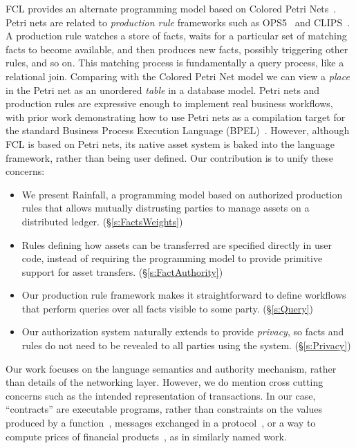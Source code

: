 FCL provides an alternate programming model based on Colored Petri Nets~\cite{Jensen1981:ColouredPetri}. Petri nets are related to \emph{production rule} frameworks such as OPS5~\cite{Forgy1981:OPS5} and CLIPS~\cite{Riley2017:CLIPS}. A production rule watches a store of facts, waits for a particular set of matching facts to become available, and then produces new facts, possibly triggering other rules, and so on. This matching process is fundamentally a query process, like a relational join. Comparing with the Colored Petri Net model we can view a \emph{place} in the Petri net as an unordered \emph{table} in a database model. Petri nets and production rules are expressive enough to implement real business workflows, with prior work demonstrating how to use Petri nets as a compilation target for the standard Business Process Execution Language (BPEL)~\cite{Lohmann2009:PetriBPEL}.  However, although FCL is based on Petri nets, its native asset system is baked into the language framework, rather than being user defined. Our contribution is to unify these concerns:


\begin{itemize}
\item We present Rainfall, a programming model based on authorized production rules that allows mutually distrusting parties to manage assets on a distributed ledger. (\S\ref{s:FactsWeights})

\item Rules defining how assets can be transferred are specified directly in user code, instead of requiring the programming model to provide primitive support for asset transfers. (\S\ref{s:FactAuthority})

\item Our production rule framework makes it straightforward to define workflows that perform queries over all facts visible to some party. (\S\ref{s:Query})

\item Our authorization system naturally extends to provide \emph{privacy}, so facts and rules do not need to be revealed to all parties using the system. (\S\ref{s:Privacy})

\end{itemize}

Our work focuses on the language semantics and authority mechanism, rather than details of the networking layer. However, we do mention cross cutting concerns such as the intended representation of transactions. In our case, ``contracts'' are executable programs, rather than constraints on the values produced by a function~\cite{Findler2002:Contracts}, messages exchanged in a protocol~\cite{Das2019:Resource, Deon2019:CSL}, or a way to compute prices of financial products~\cite{PeytonJones2000:Composing}, as in similarly named work.




